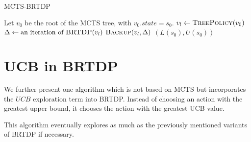 \begin{algorithm}
\caption{MCTS-BRTDP}
\label{mcts-brtdp}
\begin{algorithmic}
    \State Let $v_0$ be the root of the MCTS tree, with $v_0.state = s_0$.
        \State $v_l \gets \Call{TreePolicy}{v_0}$
        \State $\Delta \gets \text{an iteration of } \Call{BRTDP}{v_l}$
        \State $\Call{Backup}{v_l, \Delta}$
    \EndWhile
    \State \Return $(L(s_0), U(s_0))$
\EndFunction

\end{algorithmic}
\end{algorithm}

\section{UCB in BRTDP}

We further present one algorithm which is not based on MCTS but
incorporates the $UCB$ exploration term into BRTDP. Instead of choosing
an action with the greatest upper bound, it chooses the action with the
greatest UCB value.

This algorithm eventually explores as much as the previously mentioned
variants of BRTDP if necessary.
